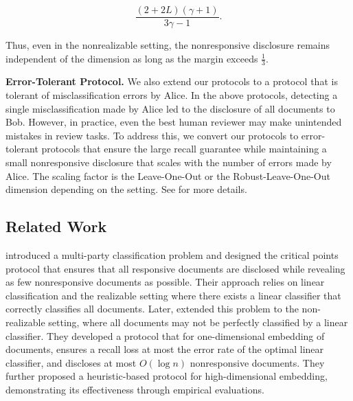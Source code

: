 \[
\frac{(2+2L)(\gamma+1)}{3\gamma -1}.
\]

Thus, even in the nonrealizable setting, the nonresponsive disclosure remains independent of the dimension as long as the margin exceeds $\frac{1}{3}$.

\textbf{Error-Tolerant Protocol.} We also extend our protocols to a protocol that is tolerant of misclassification errors by Alice. 
In the above protocols, detecting a single misclassification made by Alice led to the disclosure of all documents to Bob. 
However, in practice, even the best human reviewer may make unintended mistakes in review tasks.
To address this, we convert our protocols to error-tolerant protocols that ensure the large recall guarantee while maintaining a small nonresponsive disclosure that scales with the number of errors made by Alice. The scaling factor is the Leave-One-Out or the Robust-Leave-One-Out dimension depending on the setting.
See  for more details.

\subsection{Related Work}

\cite{dong2022classification} introduced a multi-party classification problem and designed the critical points protocol that ensures that all responsive documents are disclosed while revealing as few nonresponsive documents as possible. 
Their approach relies on linear classification and the realizable setting where there exists a linear classifier that correctly classifies all documents. 
Later, \citet{dong2024error} extended this problem to the non-realizable setting, where all documents may not be perfectly classified by a linear classifier. 
They developed a protocol that for one-dimensional embedding of documents, ensures a recall loss at most the error rate of the optimal linear classifier, and discloses at most $O(\log n)$ nonresponsive documents. They further proposed a heuristic-based protocol for high-dimensional embedding, demonstrating its effectiveness through empirical evaluations.


